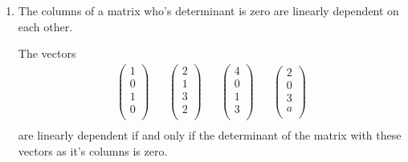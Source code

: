 \documentclass[10pt,oneside,a4paper]{article}
\begin{document}
\begin{enumerate}
\item 

The columns of a matrix who's determinant is zero are linearly dependent on each other.

The vectors 
\begin{align*}
\begin{pmatrix} 1 \\ 0 \\ 1 \\ 0 \\ \end{pmatrix} & & \begin{pmatrix} 2 \\ 1 \\ 3 \\ 2 \\ \end{pmatrix} & & \begin{pmatrix} 4 \\ 0 \\ 1 \\ 3 \\ \end{pmatrix} & & \begin{pmatrix} 2 \\ 0 \\ 3 \\ a \\ \end{pmatrix} \\
\end{align*}
are linearly dependent if and only if the determinant of the matrix with these vectors as it's columns is zero.


\end{enumerate}
\end{document}
